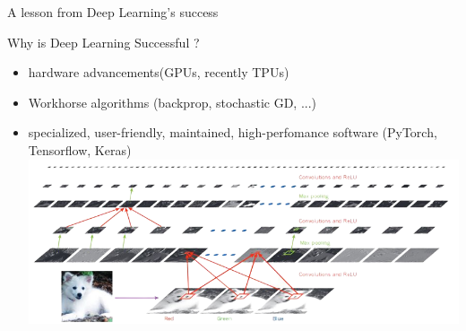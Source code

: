 \begin{frame}{A lesson from Deep Learning's success}
	\begin{Large}
		Why is Deep Learning \alert{Successful} ? 
	\end{Large}

	\begin{itemize}
		\item hardware advancements(GPUs, recently TPUs)
		\item Workhorse algorithms (backprop, stochastic GD, ...)
		\item specialized, user-friendly, maintained, high-perfomance software (PyTorch, Tensorflow, Keras)
		\includegraphics[width=.8\linewidth]{backprop}
	\end{itemize}	
\end{frame}

